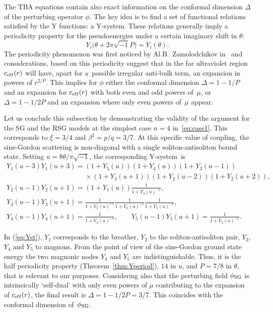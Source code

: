 \documentclass[pdftex]{sigma}
\numberwithin{equation}{section}
\theoremstyle{definition}
\begin{document}
The TBA equations contain also exact  information on the conformal dimension $\Delta$ of the perturbing operator $\phi$.
The key idea is to f\/ind a set of functional relations satisf\/ied by the Y functions: a Y-system.
These relations generally imply a periodicity property for the
pseudo\-energies under a certain imaginary shift in $\theta$:
\[
Y_i\big(\theta +  2 \pi \sqrt{-1} P\big) = Y_i(\theta).
\]
The periodicity phenomenon was f\/irst noticed by Al.B.~Zamolodchikov in~\cite{Zamolodchikov91}
and considerations, based on this periodicity suggest that in the far  ultraviolet
region  $c_{\rm ef\/f}(r)$  will have, apart  for a~possible  irregular anti-bulk term,
an expansion in powers of $r^{2/P}$.
This implies for  $\phi$ either the conformal dimension $\Delta=1-1/P$
and an expansion for $c_{\rm ef\/f}(r)$ with both even and odd powers of~$\mu$,
or  $\Delta=1-1/2P$  and an expansion where  only even powers  of~$\mu$ appear.

Let us conclude this  subsection  by demonstrating
the validity of the argument for
 the SG and the RSG models at the simplest case $n=4$ in~\eqref{eq:case1}. This corresponds to
$\xi=3/4$ and $\beta^2=p/q=3/7$.
At this specif\/ic value of coupling, the sine-Gordon  scattering is non-diagonal with a  single soliton-antisoliton
bound state. Setting  $u= 8 \theta/\pi\sqrt{-1}$,
 the corresponding Y-system~is
\begin{gather}
Y_1(u-3) Y_1(u+3)
=
( 1+ Y_5(u)) ( 1+ Y_4(u)) ( 1+ Y_3(u-1))  \nonumber \\
\phantom{Y_1(u-3) Y_1(u+3)
=}{}
\times
( 1+ Y_3(u+1))( 1+ Y_2(u-2)) ( 1+ Y_2(u+2)), \nonumber\\
Y_2(u-1) Y_2(u+1)
= ( 1+ Y_1(u)) \frac{1}{ 1+Y_3(u)^{-1}},\nonumber\\
Y_3(u-1) Y_3(u+1) =\frac{1}{1+Y_2(u)^{-1}}\frac{1}{ 1+Y_4(u)^{-1}} \frac{1}{1+Y_5(u)^{-1}},   \nonumber\\
Y_4(u-1) Y_4(u+1) = \frac{1}{1+Y_3(u)^{-1}},   \qquad
Y_5(u-1) Y_5(u+1) = \frac{1}{1+Y_3(u)^{-1}}.\label{eq:Yst}
\end{gather}

In (\ref{eq:Yst}), $Y_1$ corresponds to  the  breather, $Y_2$
to the soliton-antisoliton pair, $Y_3$, $Y_4$ and $Y_5$ to magnons.
From the point of view of the sine-Gordon ground state energy the
two  magnonic  nodes  $Y_4$ and $Y_5$ are indistinguishable.
Thus,  it is  the half periodicity property
(Theorem~\ref{thm:Yperiod}),
$14$ in $u$, and
 $P=7/8$ in $\theta$, that is relevant to our purposes. Considering also that  the perturbing
f\/ield $\phi_{\rm SG}$ is intrinsically `self-dual' with only  even powers of $\mu$ contributing
to   the expansion of $c_{\rm ef\/f}(r)$,
the f\/inal  result is   $\Delta=1 - 1/2P= 3/7$. This coincides  with the  conformal dimension of~$\phi_{\rm SG}$.
\end{document}
